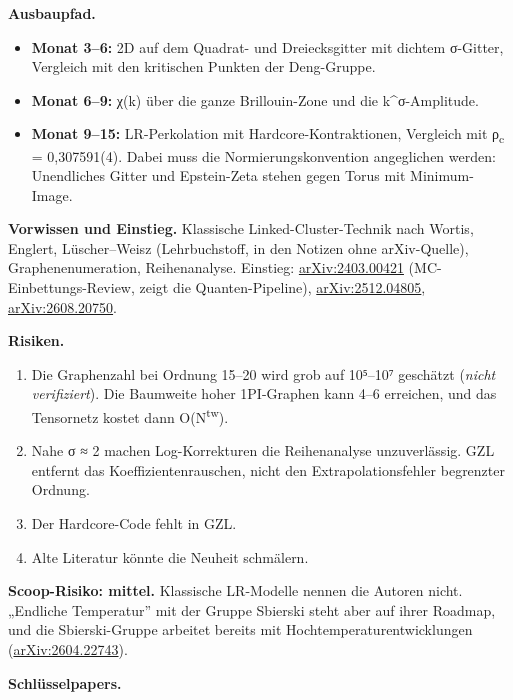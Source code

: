 \textbf{Ausbaupfad.}

\begin{itemize}
\tightlist
\item
  \textbf{Monat 3--6:} 2D auf dem Quadrat- und Dreiecksgitter mit dichtem σ-Gitter, Vergleich mit den kritischen Punkten der Deng-Gruppe.
\item
  \textbf{Monat 6--9:} χ(k) über die ganze Brillouin-Zone und die \textbar k\textbar\^{}σ-Amplitude.
\item
  \textbf{Monat 9--15:} LR-Perkolation mit Hardcore-Kontraktionen, Vergleich mit ρ\textsubscript{c} = 0,307591(4). Dabei muss die Normierungskonvention angeglichen werden: Unendliches Gitter und Epstein-Zeta stehen gegen Torus mit Minimum-Image.
\end{itemize}

\textbf{Vorwissen und Einstieg.} Klassische Linked-Cluster-Technik nach Wortis, Englert, Lüscher--Weisz (Lehrbuchstoff, in den Notizen ohne arXiv-Quelle), Graphenenumeration, Reihenanalyse. Einstieg: \href{https://arxiv.org/abs/2403.00421}{arXiv:2403.00421} (MC-Einbettungs-Review, zeigt die Quanten-Pipeline), \href{https://arxiv.org/abs/2512.04805}{arXiv:2512.04805}, \href{https://arxiv.org/html/2608.20750}{arXiv:2608.20750}.

\textbf{Risiken.}

\begin{enumerate}
\def\labelenumi{\arabic{enumi}.}
\tightlist
\item
  Die Graphenzahl bei Ordnung 15--20 wird grob auf 10⁵--10⁷ geschätzt (\emph{nicht verifiziert}). Die Baumweite hoher 1PI-Graphen kann 4--6 erreichen, und das Tensornetz kostet dann O(N\textsuperscript{tw}).
\item
  Nahe σ ≈ 2 machen Log-Korrekturen die Reihenanalyse unzuverlässig. GZL entfernt das Koeffizientenrauschen, nicht den Extrapolationsfehler begrenzter Ordnung.
\item
  Der Hardcore-Code fehlt in GZL.
\item
  Alte Literatur könnte die Neuheit schmälern.
\end{enumerate}

\textbf{Scoop-Risiko: mittel.} Klassische LR-Modelle nennen die Autoren nicht. „Endliche Temperatur'' mit der Gruppe Sbierski steht aber auf ihrer Roadmap, und die Sbierski-Gruppe arbeitet bereits mit Hochtemperaturentwicklungen (\href{https://arxiv.org/abs/2604.22743}{arXiv:2604.22743}).

\textbf{Schlüsselpapers.}

